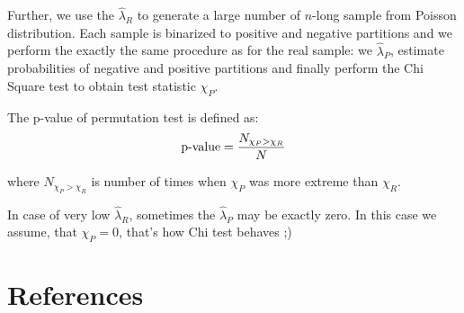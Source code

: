 \documentclass[review]{elsarticle}
\begin{document}
Further, we use the $\hat\lambda_R$ to generate a large number of $n$-long sample from Poisson distribution. Each sample is binarized to positive and negative partitions and we perform the exactly the same procedure as for the real sample: we $\hat\lambda_P$, estimate probabilities of negative and positive partitions and finally perform the Chi Square test to obtain test statistic $\chi_P$.

The p-value of permutation test is defined as:
\begin{equation}   
\textnormal{p-value} = \frac{N_{\chi_P > \chi_R}}{N}
\end{equation}

where $N_{\chi_P > \chi_R}$ is number of times when $\chi_P$ was more extreme than $\chi_R$.

In case of very low $\hat\lambda_R$, sometimes the $\hat\lambda_P$ may be exactly zero. In this case we assume, that $\chi_P = 0$, that's how Chi test behaves ;)


\section*{References}


\end{document}
